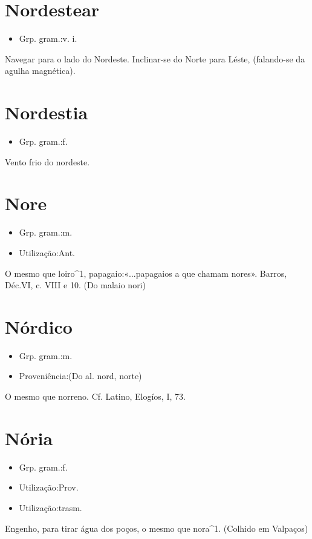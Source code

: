 \section{Nordestear}
\begin{itemize}
\item {Grp. gram.:v. i.}
\end{itemize}
Navegar para o lado do Nordeste.
Inclinar-se do Norte para Léste, (falando-se da agulha magnética).
\section{Nordestia}
\begin{itemize}
\item {Grp. gram.:f.}
\end{itemize}
Vento frio do nordeste.
\section{Nore}
\begin{itemize}
\item {Grp. gram.:m.}
\end{itemize}
\begin{itemize}
\item {Utilização:Ant.}
\end{itemize}
O mesmo que \textunderscore loiro\textunderscore ^1, papagaio:«\textunderscore ...papagaios a que chamam nores\textunderscore ». Barros, \textunderscore Déc.\textunderscore  VI, c. VIII e 10.
(Do malaio \textunderscore nori\textunderscore )
\section{Nórdico}
\begin{itemize}
\item {Grp. gram.:m.}
\end{itemize}
\begin{itemize}
\item {Proveniência:(Do al. \textunderscore nord\textunderscore , norte)}
\end{itemize}
O mesmo que \textunderscore norreno\textunderscore . Cf. Latino, \textunderscore Elogíos\textunderscore , I, 73.
\section{Nória}
\begin{itemize}
\item {Grp. gram.:f.}
\end{itemize}
\begin{itemize}
\item {Utilização:Prov.}
\end{itemize}
\begin{itemize}
\item {Utilização:trasm.}
\end{itemize}
Engenho, para tirar água dos poços, o mesmo que \textunderscore nora\textunderscore ^1.
(Colhido em Valpaços)
